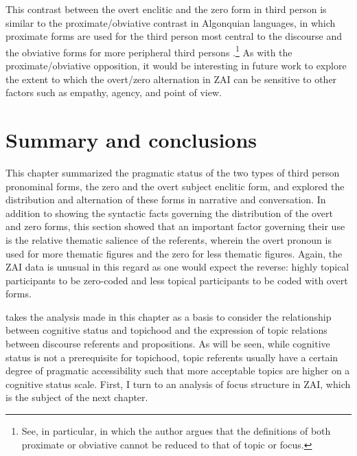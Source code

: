 This contrast between the overt enclitic and the zero form in third person is similar to the proximate/obviative contrast in Algonquian languages, in which proximate forms are used for the third person most central to the discourse and the obviative forms for more peripheral third persons \citep{dahlstrom1991,dahlstrom2003,dahlstrom2014}.\footnote{See, in particular, \citet{dahlstrom2014} in which the author argues that the definitions of both proximate or obviative cannot be reduced to that of topic or focus.} As with the proximate/obviative opposition, it would be interesting in future work to explore the extent to which the overt/zero alternation in ZAI can be sensitive to other factors such as empathy, agency, and point of view.


\section{Summary and conclusions}
This chapter summarized the pragmatic status of the two types of third person pronominal forms, the zero and the overt subject enclitic form, and explored the distribution and alternation of these forms in narrative and conversation. In addition to showing the syntactic facts governing the distribution of the overt and zero forms, this section showed that an important factor governing their use is the relative thematic salience of the referents, wherein the overt pronoun is used for more thematic figures and the zero for less thematic figures. Again, the ZAI data is unusual in this regard as one would expect the reverse: highly topical participants to be zero-coded and less topical participants to be coded with overt forms.

 takes the analysis made in this chapter as a basis to consider the relationship between cognitive status and topichood and the expression of topic relations between discourse referents and propositions. As will be seen, while cognitive status is not a prerequisite for topichood, topic referents usually have a certain degree of pragmatic accessibility such that more acceptable topics are higher on a cognitive status scale. First, I turn to an analysis of focus structure in ZAI, which is the subject of the next chapter.

\lehead{\headmark}